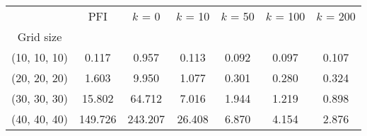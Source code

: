 \begin{tabular}{ccccccc}
\toprule
{} &      PFI &  $k$ = 0 &  $k$ = 10 &  $k$ = 50 &  $k$ = 100 &  $k$ = 200 \\
Grid size    &          &          &           &           &            &            \\
\midrule
(10, 10, 10) &    0.117 &    0.957 &     0.113 &     0.092 &      0.097 &      0.107 \\
(20, 20, 20) &    1.603 &    9.950 &     1.077 &     0.301 &      0.280 &      0.324 \\
(30, 30, 30) &   15.802 &   64.712 &     7.016 &     1.944 &      1.219 &      0.898 \\
(40, 40, 40) &  149.726 &  243.207 &    26.408 &     6.870 &      4.154 &      2.876 \\
\bottomrule
\end{tabular}

